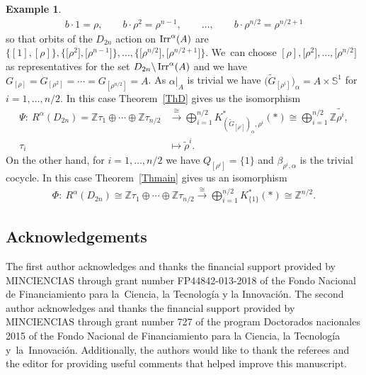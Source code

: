 \documentclass[pdftex]{sigma}
\def\Z{\mathbb{Z}}
\def\S{\mathbb{S}}
\DeclareMathOperator{\Irr}{\textup{Irr}}
\theoremstyle{definition}
\newtheorem{Ex}[Th]{Example}
\numberwithin{equation}{section}
\begin{document}
\begin{Ex}
\begin{gather*}
b\cdot 1=\rho,\qquad b\cdot \rho^{2}=\rho^{n-1},\qquad
\dots,\qquad b\cdot \rho^{n/2}=\rho^{n/2+1}
\end{gather*}
so that orbits of the $D_{2n}$ action on $\Irr^{\alpha}(A)$ are
$\big\{[1], [\rho]\big\}, \big\{\big[\rho^{2}\big], \big[\rho^{n-1}\big]\big\}, \dots, \big\{\big[\rho^{n/2}\big], \big[\rho^{n/2+1}\big]\big\}$.
We~can choose $[\rho], \big[\rho^{2}\big],\dots, \big[\rho^{n/2}\big]$ as representatives for the set
$D_{2n}\backslash \Irr^{\alpha}(A)$ and we have $G_{[\rho]}=G_{[\rho^{2}]}=\cdots =
G_{[\rho^{n/2}]}=A$. As $\alpha|_{A}$ is trivial we have
$\big(\widetilde{G}_{[\rho^{i}]}\big)_{\alpha}=A\times \S^{1}$ for $i=1, \dots, n/2$.
In this case Theorem~\ref{ThD} gives us the isomorphism
\begin{align*}
\Psi\colon\ R^{\alpha}(D_{2n})
=\Z\tau_{1}\oplus\cdots \oplus \Z\tau_{n/2}
&\stackrel{\cong}{\rightarrow}
\bigoplus_{i=1}^{n/2}K^{\ast}_{(\widetilde{G}_{[\rho^{i}]})_{\alpha},\rho^{i}}(\ast)
\cong \bigoplus_{i=1}^{n/2}
 \Z\tilde{\rho^{i}},
 \\
\tau_{i}&\mapsto \tilde{\rho}^{i}.
\end{align*}
On the other hand, for $i=1, \dots, n/2$ we have $Q_{[\rho^{i}]}=\{1\}$ and
$\beta_{\rho^{i},\alpha}$ is the trivial cocycle. In this case
Theorem~\ref{Thmain} gives us an isomorphism
\begin{gather*}
\Phi\colon\ R^{\alpha}(D_{2n})\cong \Z\tau_{1}\oplus\cdots \oplus \Z\tau_{n/2}
\stackrel{\cong}{\rightarrow} \bigoplus_{i=1}^{n/2}K^{\ast}_{\{1\}}(\ast)\cong \Z^{n/2}.
\end{gather*}
\end{Ex}


\subsection*{Acknowledgements}

The first author acknowledges and thanks the financial support provided by
MINCIENCIAS through grant number FP44842-013-2018 of the
Fondo Nacional de Financiamiento para la~Ciencia, la Tecnolog\'ia y la Innovaci\'on.
The second author acknowledges and thanks the financial support provided by MINCIENCIAS
through grant number 727 of the program Doctorados nacio\-nales 2015 of the Fondo Nacional de
Financiamiento para la Ciencia, la Tecnolog\'ia y~la~Inno\-vaci\'on. Additionally, the authors would
like to thank the referees and the editor for providing useful comments that helped improve this manuscript.
\end{document}

